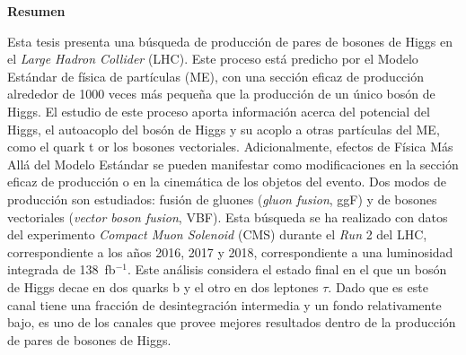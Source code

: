\documentclass[../main.tex]{subfiles}
\begin{document}
\thispagestyle{plain}
\begin{center}
\textbf{Resumen}
\end{center}

Esta tesis presenta una búsqueda de producción de pares de bosones de Higgs en el \textit{Large Hadron Collider} (LHC). Este proceso está predicho por el Modelo Estándar de física de partículas (ME), con una sección eficaz de producción alrededor de 1000 veces más pequeña que la producción de un único bosón de Higgs. El estudio de este proceso aporta información acerca del potencial del Higgs, el autoacoplo del bosón de Higgs y su acoplo a otras partículas del ME, como el quark t or los bosones vectoriales. Adicionalmente, efectos de Física Más Allá del Modelo Estándar se pueden manifestar como modificaciones en la sección eficaz de producción o en la cinemática de los objetos del evento. Dos modos de producción son estudiados: fusión de gluones (\textit{gluon fusion}, ggF) y de bosones vectoriales (\textit{vector boson fusion}, VBF). Esta búsqueda se ha realizado con datos del experimento \textit{Compact Muon Solenoid} (CMS) durante el \textit{Run} 2 del LHC, correspondiente a los años 2016, 2017 y 2018, correspondiente a una luminosidad integrada de 138~fb${}^{-1}$. Este análisis considera el estado final en el que un bosón de Higgs decae en dos quarks b y el otro en dos leptones $\tau$. Dado que es este canal tiene una fracción de desintegración intermedia y un fondo relativamente bajo, es uno de los canales que provee mejores resultados dentro de la producción de pares de bosones de Higgs.
\end{document}
